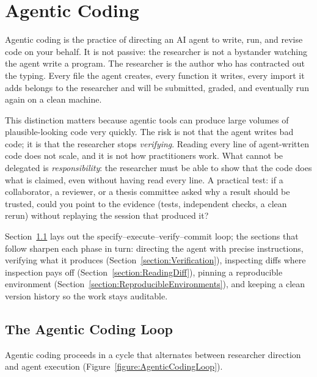 \chapter{Agentic Coding}
\label{chapter:AgenticCoding}

Agentic coding is the practice of directing an AI agent to write, run, and revise code on your behalf.
It is not passive: the researcher is not a bystander watching the agent write a program.
The researcher is the author who has contracted out the typing.
Every file the agent creates, every function it writes, every import it adds belongs to the researcher and will be submitted, graded, and eventually run again on a clean machine.

This distinction matters because agentic tools can produce large volumes of plausible-looking code very quickly.
The risk is not that the agent writes bad code; it is that the researcher stops \emph{verifying}.
Reading every line of agent-written code does not scale, and it is not how practitioners work.
What cannot be delegated is \emph{responsibility}: the researcher must be able to show that the code does what is claimed, even without having read every line.
A practical test: if a collaborator, a reviewer, or a thesis committee asked why a result should be trusted, could you point to the evidence (tests, independent checks, a clean rerun) without replaying the session that produced it?

Section~\ref{section:AgenticCodingLoop} lays out the specify--execute--verify--commit loop; the sections that follow sharpen each phase in turn: directing the agent with precise instructions, verifying what it produces (Section~\ref{section:Verification}), inspecting diffs where inspection pays off (Section~\ref{section:ReadingDiff}), pinning a reproducible environment (Section~\ref{section:ReproducibleEnvironments}), and keeping a clean version history so the work stays auditable.

\section{The Agentic Coding Loop}
\label{section:AgenticCodingLoop}

Agentic coding proceeds in a cycle that alternates between researcher direction and agent execution (Figure~\ref{figure:AgenticCodingLoop}).

